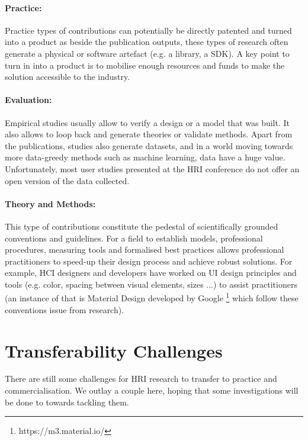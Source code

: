 \documentclass[letterpaper]{article} %
\begin{document}
\paragraph{Practice:} Practice types of contributions can potentially be directly patented and turned into a product as beside the publication outputs, these types of research often generate a physical or software artefact (e.g. a library, a SDK).
A key point to turn in into a product is to mobilise enough resources and funds to make the solution accessible to the industry.

\paragraph{Evaluation:} Empirical studies usually allow to verify a design or a model that was built. It also allows to loop back and generate theories or validate methods. Apart from the publications, studies also generate datasets, and in a world moving towards more data-greedy methods such as machine learning, data have a huge value. Unfortunately, most user studies presented at the HRI conference do not offer an open version of the data collected.

\paragraph{Theory and Methods:} This type of contributions constitute the pedestal of scientifically grounded conventions and guidelines. For a field to establish models, professional procedures, measuring tools and formalised best practices allows professional practitioners to speed-up their design process and achieve robust solutions.
For example, HCI designers and developers have worked on UI design principles and tools (e.g. color, spacing between visual elements, sizes ...) to assist practitioners (an instance of that is Material Design developed by Google \footnote{https://m3.material.io/}  which follow these conventions issue from research).


\section{Transferability Challenges}
There are still some challenges for HRI research to transfer to practice and commercialisation. We outlay a couple here, hoping that some investigations will be done to towards tackling them.
\end{document}
